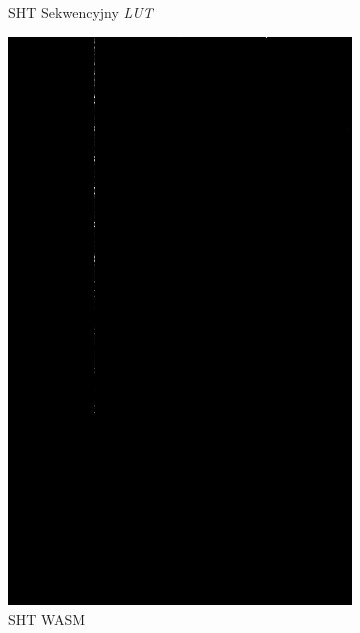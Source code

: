 \begin{figure}[h]
\begin{subfigure}{0.3\textwidth}
        \caption{SHT Sekwencyjny \textit{LUT}}\label{fig:diff:seq_lut}
    \end{subfigure}\hfill
    \begin{subfigure}{0.3\textwidth}
        \includegraphics[width=\linewidth] {../../packages/js-benchmarks/img/diff_seq_wasm.png}
        \caption{SHT WASM}\label{fig:diff:wasm}
    \end{subfigure}\hfill
    \begin{subfigure}{0.3\textwidth}

\end{subfigure}
\end{figure}
